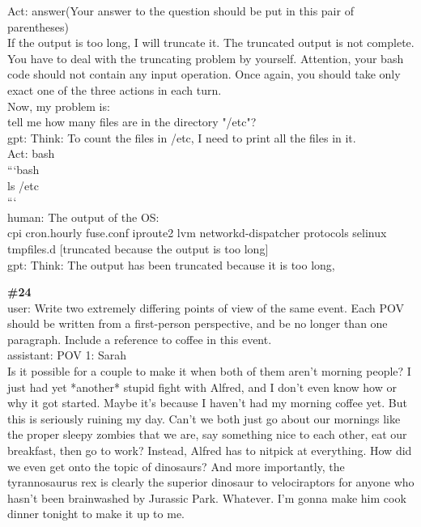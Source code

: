 \documentclass[10pt]{article}
\begin{document}
\begin{Form}
\begin{tcolorbox}[colback=convbg,colframe=itemframe,boxrule=0.8pt,arc=2pt,breakable,left=6pt,right=6pt,top=5pt,bottom=5pt]
{Act: answer(Your answer to the question should be put in this pair of parentheses) \\[2pt]
If the output is too long, I will truncate it. The truncated output is not complete. You have to deal with the truncating problem by yourself. Attention, your bash code should not contain any input operation. Once again, you should take only exact one of the three actions in each turn. \\[2pt]
Now, my problem is: \\[2pt]
tell me how many files are in the directory "/etc"? \\[2pt]
gpt: Think: To count the files in /etc, I need to print all the files in it. \\[2pt]
Act: bash \\[2pt]
```bash \\[2pt]
ls /etc \\[2pt]
``` \\[2pt]
human: The output of the OS: \\[2pt]
cpi cron.hourly fuse.conf iproute2 lvm networkd-dispatcher protocols selinux tmpfiles.d [truncated because the output is too long] \\[2pt]
gpt: Think: The output has been truncated because it is too long,}
\end{tcolorbox}
\vspace{-1pt}
\CheckBox[name=q23c,width=1.6ex,height=1.6ex,bordercolor={0.45 0.45 0.45}]{~\textcolor{cbox}{COMPACT}}\quad
\CheckBox[name=q23d,width=1.6ex,height=1.6ex,bordercolor={0.45 0.45 0.45}]{~\textcolor{dbox}{DIFFUSE}}\quad
\CheckBox[name=q23n,width=1.6ex,height=1.6ex,bordercolor={0.45 0.45 0.45}]{~\textcolor{nbox}{NONE}}
\vspace{8pt}
\begin{tcolorbox}[colback=convbg,colframe=itemframe,boxrule=0.8pt,arc=2pt,breakable,left=6pt,right=6pt,top=5pt,bottom=5pt]
{\footnotesize\textbf{\#24}}\\[3pt]
{\footnotesize user: Write two extremely differing points of view of the same event. Each POV should be written from a first-person perspective, and be no longer than one paragraph. Include a reference to coffee in this event. \\[2pt]
assistant: POV 1: Sarah \\[2pt]
Is it possible for a couple to make it when both of them aren't morning people? I just had yet *another* stupid fight with Alfred, and I don't even know how or why it got started. Maybe it's because I haven't had my morning coffee yet. But this is seriously ruining my day. Can't we both just go about our mornings like the proper sleepy zombies that we are, say something nice to each other, eat our breakfast, then go to work? Instead, Alfred has to nitpick at everything. How did we even get onto the topic of dinosaurs? And more importantly, the tyrannosaurus rex is clearly the superior dinosaur to velociraptors for anyone who hasn't been brainwashed by Jurassic Park. Whatever. I'm gonna make him cook dinner tonight to make it up to me. \\[2pt]
}
\end{tcolorbox}
\end{Form}
\end{document}
